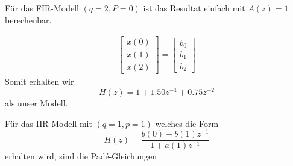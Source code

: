 \begin{beispiel}
Für das FIR-Modell $(q=2,P=0)$ ist das Resultat einfach mit $A(z)=1$ berechenbar.

\begin{equation}\begin{array}{r}

{\left[\begin{array}{l}
	x(0) \\
	x(1) \\
	x(2)
\end{array}\right]
=
\left[\begin{array}{l}
	b_0 \\
	b_1 \\
	b_2
	\end{array}\right]}
\end{array}\end{equation} 
Somit erhalten wir 
\begin{equation}
H(z)=1+1.50 z^{-1}+0.75 z^{-2}
\end{equation}
als unser Modell.

Für das IIR-Modell mit $(q=1,p=1)$ welches die Form
\begin{equation}
H(z)=\frac{b(0)+b(1) z^{-1}}{1+a(1) z^{-1}}
\end{equation}
erhalten wird, sind die Padé-Gleichungen


\end{beispiel}
